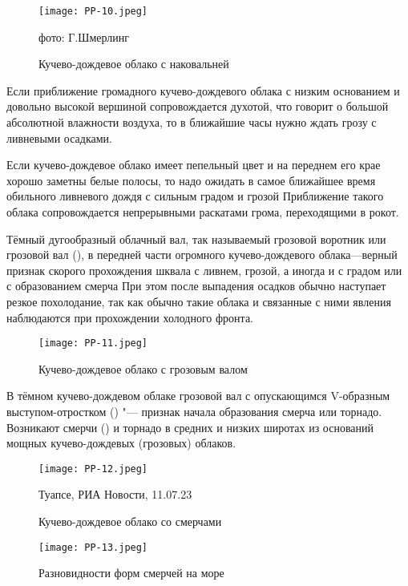 \begin{figure}[htb]
  \centering{}
  \texttt{[image: PP-10.jpeg]}
  \caption{Кучево-дождевое облако с наковальней}
  \label{fig:pp10}
  \small
  \centering{}фото: Г.Шмерлинг
\end{figure}


 Если приближение громадного кучево-дождевого облака с низким
основанием и довольно высокой вершиной сопровождается духотой, что
говорит о большой абсолютной влажности воздуха, то в ближайшие часы
нужно ждать грозу с ливневыми осадками.

 Если кучево-дождевое облако имеет пепельный цвет и на переднем
его крае хорошо заметны белые полосы, то надо ожидать в самое
ближайшее время обильного ливневого дождя с сильным градом и грозой
Приближение такого облака сопровождается непрерывными раскатами грома,
переходящими в рокот.

 Тёмный дугообразный облачный вал, так называемый грозовой
воротник или грозовой вал (), в передней части огромного
кучево-дождевого облака—верный признак скорого прохождения шквала с
ливнем, грозой, а иногда и с градом или с образованием смерча При этом
после выпадения осадков обычно наступает резкое похолодание, так как
обычно такие облака и связанные с ними явления наблюдаются при
прохождении холодного фронта.

\begin{figure}[htb]
  \centering{}
  \texttt{[image: PP-11.jpeg]}
  \caption{Кучево-дождевое облако с грозовым валом}
  \label{fig:pp11}
  \small
  \centering{}
\end{figure}

 В тёмном кучево-дождевом облаке грозовой вал с опускающимся
V-образным выступом-отростком () "--- признак начала образования
смерча или торнадо. Возникают смерчи () и торнадо в средних и
низких широтах из оснований мощных кучево-дождевых (грозовых) облаков.

\begin{figure}[htb]
  \centering{}
  \texttt{[image: PP-12.jpeg]}
  \caption{Кучево-дождевое облако со смерчами}
  \label{fig:pp12}
  \small
  \centering{}Туапсе, РИА Новости, 11.07.23
\end{figure}

\begin{figure}[htb]
  \centering{}
  \texttt{[image: PP-13.jpeg]}
  \caption{Разновидности форм смерчей на море}
  \label{fig:pp13}
  \small
  \centering{}
\end{figure}


